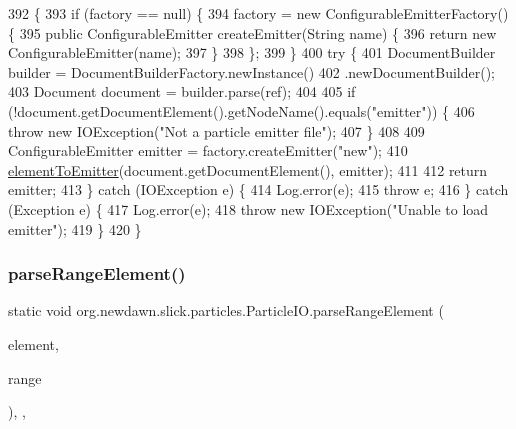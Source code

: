 \begin{DoxyCode}
392                                                                    \{
393         \textcolor{keywordflow}{if} (factory == null) \{
394             factory = \textcolor{keyword}{new} ConfigurableEmitterFactory() \{
395                 \textcolor{keyword}{public} ConfigurableEmitter createEmitter(String name) \{
396                     \textcolor{keywordflow}{return} \textcolor{keyword}{new} ConfigurableEmitter(name);
397                 \}
398             \};
399         \}
400         \textcolor{keywordflow}{try} \{
401             DocumentBuilder builder = DocumentBuilderFactory.newInstance()
402                     .newDocumentBuilder();
403             Document document = builder.parse(ref);
404 
405             \textcolor{keywordflow}{if} (!document.getDocumentElement().getNodeName().equals(\textcolor{stringliteral}{"emitter"})) \{
406                 \textcolor{keywordflow}{throw} \textcolor{keyword}{new} IOException(\textcolor{stringliteral}{"Not a particle emitter file"});
407             \}
408 
409             ConfigurableEmitter emitter = factory.createEmitter(\textcolor{stringliteral}{"new"});
410             \mbox{\hyperlink{classorg_1_1newdawn_1_1slick_1_1particles_1_1_particle_i_o_a0f9a2d655a230395efcb645a520cf988}{elementToEmitter}}(document.getDocumentElement(), emitter);
411 
412             \textcolor{keywordflow}{return} emitter;
413         \} \textcolor{keywordflow}{catch} (IOException e) \{
414             Log.error(e);
415             \textcolor{keywordflow}{throw} e;
416         \} \textcolor{keywordflow}{catch} (Exception e) \{
417             Log.error(e);
418             \textcolor{keywordflow}{throw} \textcolor{keyword}{new} IOException(\textcolor{stringliteral}{"Unable to load emitter"});
419         \}
420     \}
\end{DoxyCode}
\mbox{\label{classorg_1_1newdawn_1_1slick_1_1particles_1_1_particle_i_o_a99f79efdbfa98c3d6c2fff816ed9c312}} 
\subsubsection{\texorpdfstring{parse\+Range\+Element()}{parseRangeElement()}}
{\footnotesize\ttfamily static void org.\+newdawn.\+slick.\+particles.\+Particle\+I\+O.\+parse\+Range\+Element (\begin{DoxyParamCaption}\item[{Element}]{element,  }\item[{Configurable\+Emitter.\+Range}]{range }\end{DoxyParamCaption})\hspace{0.3cm}{\ttfamily [inline]}, {\ttfamily [static]}, {\ttfamily [private]}}

